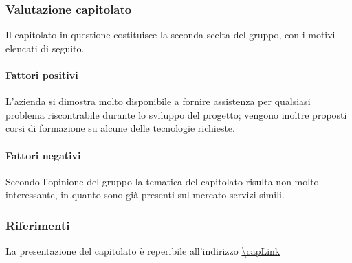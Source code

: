 \subsubsection{Valutazione capitolato}
Il capitolato in questione costituisce la seconda scelta del gruppo, con i motivi elencati di seguito.

\paragraph{Fattori positivi}

L'azienda si dimostra molto disponibile a fornire assistenza per qualsiasi problema riscontrabile durante lo sviluppo del progetto; vengono inoltre proposti corsi di formazione su alcune delle tecnologie richieste.

\paragraph{Fattori negativi}

Secondo l'opinione del gruppo la tematica del capitolato risulta non molto interessante, in quanto sono già presenti sul mercato servizi simili.

\subsubsection{Riferimenti}
La presentazione del capitolato è reperibile all'indirizzo \url{\capLink}